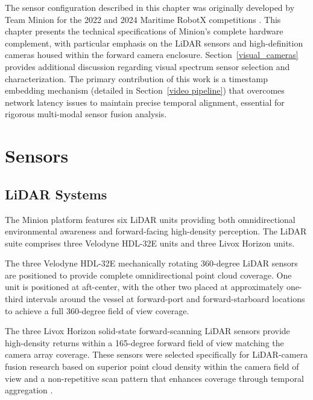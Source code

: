 \documentclass{erauthesis}
\begin{document}
The sensor configuration described in this chapter was originally developed by Team Minion for the 2022 and 2024 Maritime RobotX competitions \cite{holland2024, thompson2023}. This chapter presents the technical specifications of Minion's complete hardware complement, with particular emphasis on the \ac{LiDAR} sensors and high-definition cameras housed within the forward camera enclosure. Section~\ref{visual_cameras} provides additional discussion regarding visual spectrum sensor selection and characterization. The primary contribution of this work is a timestamp embedding mechanism (detailed in Section~\ref{video pipeline}) that overcomes network latency issues to maintain precise temporal alignment, essential for rigorous multi-modal sensor fusion analysis.
        
    \section{Sensors} \label{sensors}

\subsection{LiDAR Systems} \label{sensors_LiDAR}

The Minion platform features six \ac{LiDAR} units providing both omnidirectional environmental awareness and forward-facing high-density perception.
The \ac{LiDAR} suite comprises three Velodyne HDL-32E units and three Livox Horizon units.

The three Velodyne HDL-32E mechanically rotating 360-degree \ac{LiDAR} sensors are positioned to provide complete omnidirectional point cloud coverage.
One unit is positioned at aft-center, with the other two placed at approximately one-third intervals around the vessel at forward-port and forward-starboard locations to achieve a full 360-degree field of view coverage.

The three Livox Horizon solid-state forward-scanning \ac{LiDAR} sensors provide high-density returns within a 165-degree forward field of view matching the camera array coverage.
These sensors were selected specifically for \ac{LiDAR}-camera fusion research based on superior point cloud density within the camera field of view and a non-repetitive scan pattern that enhances coverage through temporal aggregation \cite{thompson2023}.

\end{document}
